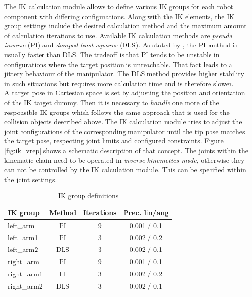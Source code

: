 The IK calculation module allows to define various IK groups for each robot component with differing configurations. Along with the IK elements, the IK group settings include the desired calculation method and the maximum amount of calculation iterations to use. Available IK calculation methods are \emph{pseudo inverse} (PI) and \emph{damped least squares} (DLS). As stated by \cite{buss2004}, the PI method is usually faster than DLS. The tradeoff is that PI tends to be unstable in configurations where the target position is unreachable. That fact leads to a jittery behaviour of the manipulator. The DLS method provides higher stability in such situations but requires more calculation time and is therefore slower. \\

A target pose in Cartesian space is set by adjusting the position and orientation of the IK target dummy. Then it is necessary to \emph{handle} one more of the responsible IK groups which follows the same approach that is used for the collision objects described above. The IK calculation module tries to adjust the joint configurations of the corresponding manipulator until the tip pose matches the target pose, respecting joint limits and configured constraints. Figure \ref{fig:ik_vrep} shows a schematic description of that concept. The joints within the kinematic chain need to be operated in \emph{inverse kinematics mode}, otherwise they can not be controlled by the IK calculation module. This can be specified within the joint settings. \\

\begin{table}[h]
  \centering
  \begin{tabular}[h]{|l|c|c|c|} \hline
	\textbf{IK group} & \textbf{Method} & \textbf{Iterations} & \textbf{Prec. lin/ang} \\ \hline
	left\_arm & PI & 9 & 0.001 / 0.1  \\
	left\_arm1 & PI & 3 & 0.002 / 0.2  \\
	left\_arm2 & DLS & 3 & 0.002 / 0.1  \\
	right\_arm & PI & 9 & 0.001 / 0.1  \\
	right\_arm1 & PI & 3 & 0.002 / 0.2  \\
	right\_arm2 & DLS & 3 & 0.002 / 0.1  \\ \hline
  \end{tabular}
  \caption{IK group definitions}
  \label{fig:ik_defs}
\end{table}

